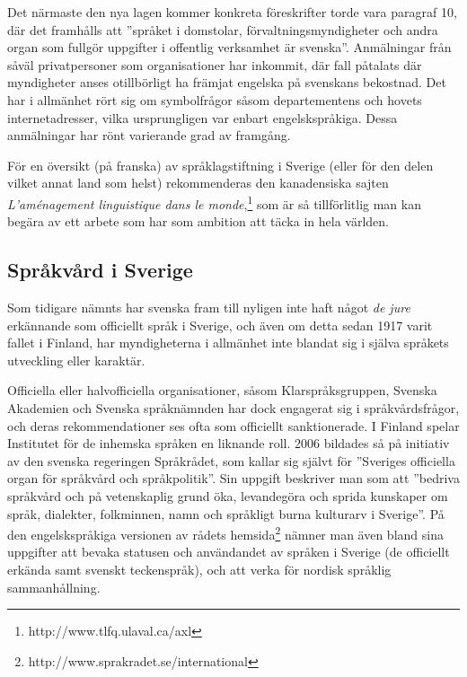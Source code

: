 \begin{multicols}{2}
Det närmaste den nya lagen kommer konkreta föreskrifter torde vara
paragraf 10, där det framhålls att ''språket i domstolar,
förvaltningsmyndigheter och andra organ som fullgör uppgifter i
offentlig verksamhet är svenska''. Anmälningar från såväl
privatpersoner som organisationer har inkommit, där fall påtalats där
myndigheter anses otillbörligt ha främjat engelska på svenskans
bekostnad. Det har i allmänhet rört sig om symbolfrågor såsom
departementens och hovets internetadresser, vilka ursprungligen var
enbart engelskspråkiga. Dessa anmälningar har rönt varierande grad av
framgång.

För en översikt (på franska) av språklagstiftning i Sverige (eller för
den delen vilket annat land som helst) rekommenderas den kanadensiska
sajten \textit{L'aménagement linguistique dans le
  monde},\footnote{http://www.tlfq.ulaval.ca/axl} som är så
tillförlitlig man kan begära av ett arbete som har som ambition att
täcka in hela världen.

\subsection{Språkvård i Sverige}

Som tidigare nämnts har svenska fram till nyligen inte haft något
\emph{de jure} erkännande som officiellt språk i Sverige, och även om
detta sedan 1917 varit fallet i Finland, har myndigheterna i allmänhet
inte blandat sig i själva språkets utveckling eller karaktär.


Officiella eller halvofficiella organisationer, såsom
Klarspråksgruppen, Svenska Akademien och Svenska språknämnden har dock
engagerat sig i språkvårdsfrågor, och deras rekommendationer ses ofta
som officiellt sanktionerade. I Finland spelar Institutet för de
inhemska språken en liknande roll. 2006 bildades så på initiativ av
den svenska regeringen Språkrådet, som kallar sig självt för
''Sveriges officiella organ för språkvård och språkpolitik''. Sin
uppgift beskriver man som att ''bedriva språkvård och på vetenskaplig
grund öka, levandegöra och sprida kunskaper om språk, dialekter,
folkminnen, namn och språkligt burna kulturarv i Sverige''. På den
engelskspråkiga versionen av rådets
hemsida\footnote{http://www.sprakradet.se/international} nämner man
även bland sina uppgifter att bevaka statusen och användandet av
språken i Sverige (de officiellt erkända samt svenskt teckenspråk),
och att verka för nordisk språklig sammanhållning.


\end{multicols}
